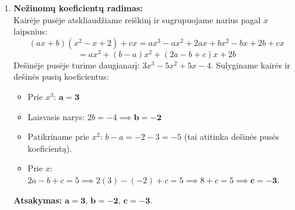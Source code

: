 \documentclass[12pt,a4paper]{article}
\begin{document}
\begin{enumerate}
    \vspace{0.3cm}
    \item \textbf{Nežinomų koeficientų radimas:} \\
    Kairėje pusėje atskliaudžiame reiškinį ir sugrupuojame narius pagal $x$ laipsnius:
    $$ (ax+b)(x^2-x+2) + cx = ax^3 - ax^2 + 2ax + bx^2 - bx + 2b + cx $$
    $$ = ax^3 + (b-a)x^2 + (2a-b+c)x + 2b $$
    Dešinėje pusėje turime daugianarį: $3x^3 - 5x^2 + 5x - 4$. Sulyginame kairės ir dešinės pusių koeficientus:
    \begin{itemize}
        \item Prie $x^3$: $\mathbf{a = 3}$
        \item Laisvasis narys: $2b = -4 \implies \mathbf{b = -2}$
        \item Patikriname prie $x^2$: $b - a = -2 - 3 = -5$ (tai atitinka dešinės pusės koeficientą).
        \item Prie $x$: $2a - b + c = 5 \implies 2(3) - (-2) + c = 5 \implies 8 + c = 5 \implies \mathbf{c = -3}$.
    \end{itemize}
    \textbf{Atsakymas:} $\mathbf{a=3}$, $\mathbf{b=-2}$, $\mathbf{c=-3}$.

\end{enumerate}
\end{document}
